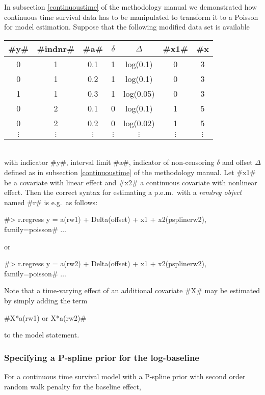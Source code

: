 In subsection \ref*{continuoustime} of the methodology manual we
demonstrated how continuous time survival data has to be manipulated
to transform it to a Poisson for model estimation. Suppose that the
following modified data set is available
\vspace{0.5cm}\\
\begin{tabular}{c|c|c|c|c|c|c}
#y# & #indnr# & #a# & $\delta$ &  $\Delta$ &   #x1# &
#x#2\\\hline\hline
0 &  1 &   0.1 &   1  &  log(0.1) & 0  & 3\\
0  & 1   & 0.2  &  1  &  log(0.1) & 0 &  3\\
1  & 1   & 0.3  &  1  &  log(0.05)& 0  & 3\\\hline
0 &  2 &   0.1 &   0 &   log(0.1) & 1 &  5\\
0  & 2  &  0.2 &   0  &  log(0.02)& 1 &  5\\\hline
$\vdots$ & $\vdots$ & $\vdots$ & $\vdots$ & $\vdots$ & $\vdots$& $\vdots$\\
\end{tabular}
\vspace{0.5cm}\\
with indicator #y#, interval limit #a#, indicator of non-censoring
$\delta$ and offset $\Delta$ defined as in subsection
\ref*{continuoustime} of the methodology manual. Let #x1# be a
covariate with linear effect and #x2# a continuous covariate with
nonlinear effect. Then the correct syntax for estimating a
p.e.m.~with a {\em remlreg object} named #r# is e.g.~as follows:

 #> r.regress y = a(rw1) + Delta(offset) + x1 + x2(psplinerw2), family=poisson# $\ldots$

or

 #> r.regress y = a(rw2) + Delta(offset) + x1 + x2(psplinerw2), family=poisson# $\ldots$

Note that a time-varying effect of an additional covariate #X# may
be estimated by simply adding the term

#X*a(rw1) or X*a(rw2)#

to the model statement.

\subsubsection*{Specifying a P-spline prior for the
log-baseline}

For a continuous time survival model with a P-spline prior with
second order random walk penalty for the baseline effect,

